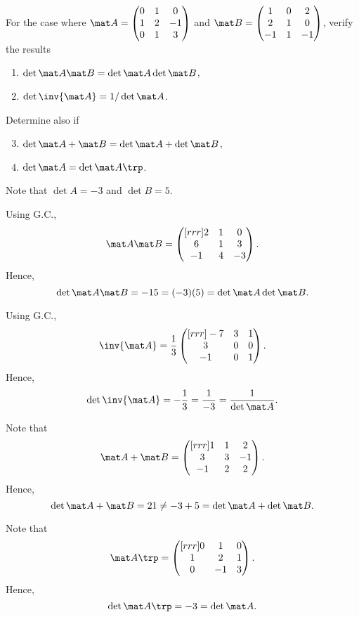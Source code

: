 \begin{problem}
    For the case where $\mat A = \begin{pmatrix} 0 & 1 & 0 \\ 1 & 2 & -1 \\ 0 & 1 & 3 \end{pmatrix}$ and $\mat B = \begin{pmatrix} 1 & 0 & 2 \\ 2 & 1 & 0 \\ -1 & 1 & -1 \end{pmatrix}$, verify the results
    \begin{enumerate}
        \item $\det{\mat A \mat B} = \det{\mat A} \det{\mat B}$,
        \item $\det{\inv{\mat A}} = 1/\det{\mat A}$.
    \end{enumerate}
    Determine also if
    \begin{enumerate}
        \setcounter{enumi}{2}
        \item $\det{\mat A + \mat B} = \det{\mat A} + \det{\mat B}$,
        \item $\det{\mat A} = \det{\mat A\trp}$.
    \end{enumerate}
\end{problem}
\begin{solution}
    Note that $\det A = -3$ and $\det B = 5$.
    \begin{ppart}
        Using G.C., \[\mat A \mat B = \begin{pmatrix}[rrr]2 & 1 & 0 \\ 6 & 1 & 3 \\ -1 & 4 & -3\end{pmatrix}.\] Hence, \[\det{\mat A \mat B} = -15 = (-3)(5) = \det{\mat A} \det{\mat B}.\]
    \end{ppart}
    \begin{ppart}
        Using G.C., \[\inv{\mat A} = \frac13 \begin{pmatrix}[rrr]-7 & 3 & 1 \\ 3 & 0 & 0 \\ -1 & 0 & 1\end{pmatrix}.\] Hence, \[\det{\inv{\mat A}} = -\frac13 = \frac1{-3} = \frac1{\det \mat A}.\]
    \end{ppart}
    \begin{ppart}
        Note that \[\mat A + \mat B = \begin{pmatrix}[rrr]1 & 1 & 2 \\ 3 & 3 & -1 \\ -1 & 2 & 2\end{pmatrix}.\] Hence, \[\det{\mat A + \mat B} = 21 \neq -3 + 5 = \det \mat A + \det \mat B.\]
    \end{ppart}
    \begin{ppart}
        Note that \[\mat A \trp = \begin{pmatrix}[rrr] 0 & 1 & 0 \\ 1 & 2 & 1 \\ 0 & -1 & 3\end{pmatrix}.\] Hence, \[\det \mat A\trp = -3 = \det \mat A.\]
    \end{ppart}
\end{solution}

